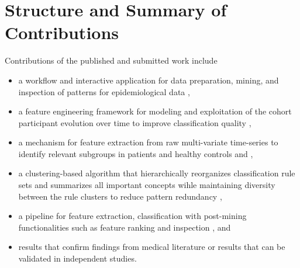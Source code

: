 \documentclass[
]{book}
\providecommand{\tightlist}{%
  \setlength{\itemsep}{0pt}\setlength{\parskip}{0pt}}
\begin{document}
\hypertarget{structure-and-summary-of-contributions}{%
\section{Structure and Summary of Contributions}\label{structure-and-summary-of-contributions}}

Contributions of the published and submitted work include

\begin{itemize}
\tightlist
\item
  a workflow and interactive application for data preparation, mining, and inspection of patterns for epidemiological data \autocite{Niemann:ESWA2014,Niemann:IMM2014},
\item
  a feature engineering framework for modeling and exploitation of the cohort participant evolution over time to improve classification quality \autocite{Niemann:CBMS2015,Niemann:SciRep2020},
\item
  a mechanism for feature extraction from raw multi-variate time-series to identify relevant subgroups in patients and healthy controls and \autocite{Niemann:CBMS2016,Niemann:PONE2016},
\item
  a clustering-based algorithm that hierarchically reorganizes classification rule sets and summarizes all important concepts wihle maintaining diversity between the rule clusters to reduce pattern redundancy \autocite{Niemann:CBMS2017},
\item
  a pipeline for feature extraction, classification with post-mining functionalities such as feature ranking and inspection \autocite{Niemann:CBMS2018}, and
\item
  results that confirm findings from medical literature or results that can be validated in independent studies.
\end{itemize}
\end{document}
